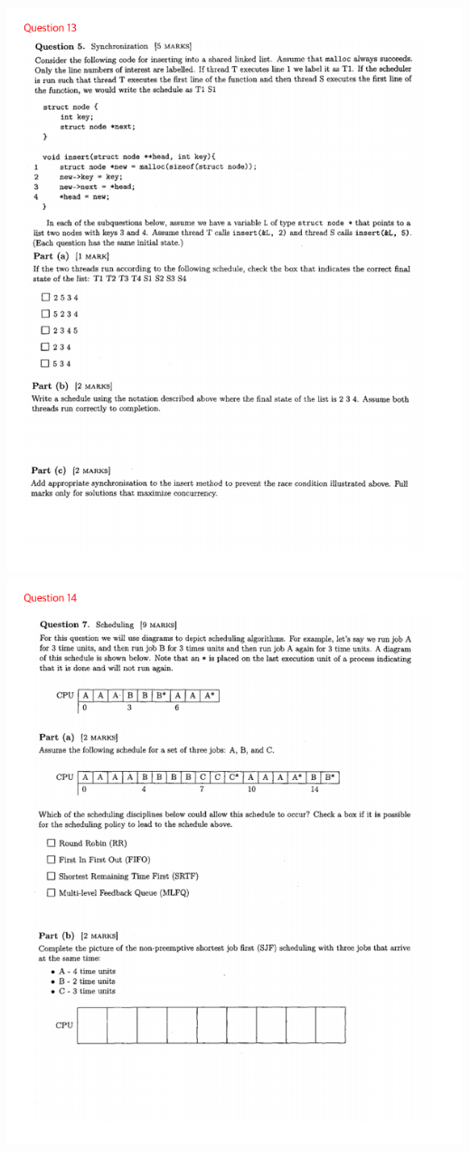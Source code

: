 \documentclass[12pt]{article}
\begin{document}
\begin{center}
    \includegraphics[width=\linewidth]{../images/midterm_5_14.png}
    \includegraphics[width=\linewidth]{../images/midterm_5_15.png}

\end{center}
\end{document}
